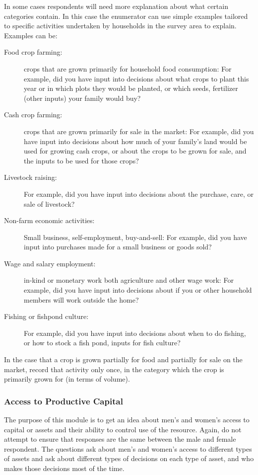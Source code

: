 \documentclass[a4paper]{refart}
\begin{document}
In some cases respondents will need more explanation about what certain categories contain. In this case the enumerator can use simple examples tailored to specific activities undertaken by households in the survey area to explain.
Examples can be:
\begin{description}
\item[Food crop farming:] crops that are grown primarily for household food consumption: For example, did you have input into decisions about what crops to plant this year or in which plots they would be planted, or which seeds, fertilizer (other inputs) your family would buy?
\item[Cash crop farming:] crops that are grown primarily for sale in the market: For example, did you have input into decisions about how much of your family’s land would be used for growing cash crops, or about the crops to be grown for sale, and the inputs to be used for those crops?
\item[Livestock raising:] For example, did you have input into decisions about the purchase, care, or sale of livestock?
\item[Non-farm economic activities:] Small business, self-employment, buy-and-sell: For example, did you have input into purchases made for a small business or goods sold?
\item[Wage and salary employment:] in-kind or monetary work both agriculture and other wage work: For example, did you have input into decisions about if you or other household members will work outside the home?
\item[Fishing or fishpond culture:] For example, did you have input into decisions about when to do fishing, or how to stock a fish pond, inputs for fish culture?
\end{description}
In the case that a crop is grown partially for food and partially for sale on the market, record that activity only once, in the category which the crop is primarily grown for (in terms of volume).

\subsubsection{Access to Productive Capital}
The purpose of this module is to get an idea about men’s and women’s access to capital or assets and their ability to control use of the resource. Again, do not attempt to ensure that responses are the same between the male and female respondent.
The questions ask about men’s and women’s access to different types of assets and ask about different types of decisions on each type of asset, and who makes those decisions most of the time.
\end{document}
